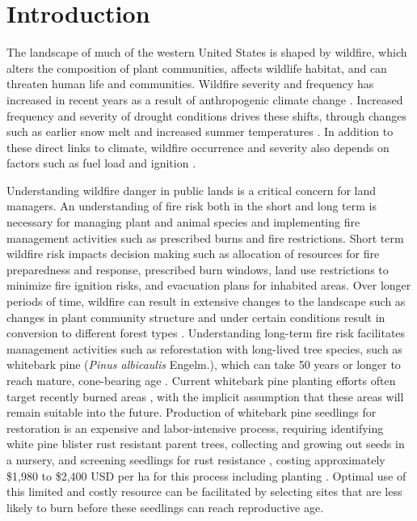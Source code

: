 \documentclass[11p]{article}
\begin{document}
\section{Introduction}

The landscape of much of the western United States is shaped by wildfire, which alters the composition of plant communities, affects wildlife habitat, and can threaten human life and communities. Wildfire severity and frequency has increased in recent years as a result of anthropogenic climate change \citep{abatzoglouImpactAnthropogenicClimate2016,runningGlobalWarmingCausing2006,boerChangingWeatherExtremes2017,littellReviewRelationshipsDrought2016}. Increased frequency and severity of drought conditions drives these shifts, through changes such as earlier snow melt \citep{tercekForecasts21stCentury2016} and increased summer temperatures \citep{runningGlobalWarmingCausing2006}. In addition to these direct links to climate, wildfire occurrence and severity also depends on factors such as fuel load and ignition \citep{mckenzieClimateChangeEcohydrology2017}.

Understanding wildfire danger in public lands is a critical concern for land managers. An understanding of fire risk both in the short and long term is necessary for managing plant and animal species and implementing fire management activities such as prescribed burns and fire restrictions. Short term wildfire risk impacts decision making such as allocation of resources for fire preparedness and response, prescribed burn windows, land use restrictions to minimize fire ignition risks, and evacuation plans for inhabited areas. Over longer periods of time, wildfire can result in extensive changes to the landscape such as changes in plant community structure and under certain conditions result in conversion to different forest types \citep{coopWildfireDrivenForestConversion2020}. Understanding long-term fire risk facilitates management activities such as reforestation with long-lived tree species, such as whitebark pine (\textit{Pinus albicaulis} Engelm.), which can take 50 years or longer to reach mature, cone-bearing age \citep{tombackWhitebarkPineCommunities2001}. Current whitebark pine planting efforts often target recently burned areas \citep{keaneRangewideRestorationStrategy2012}, with the implicit assumption that these areas will remain suitable into the future. Production of whitebark pine seedlings for restoration is an expensive and labor-intensive process, requiring identifying white pine blister rust resistant parent trees, collecting and growing out seeds in a nursery, and screening seedlings for rust resistance \citep{tombackTammReviewCurrent2022}, costing approximately \$1,980 to \$2,400 USD per ha for this process including planting \citep{tombackMagnificentHighElevationFiveNeedle2011}. Optimal use of this limited and costly resource can be facilitated by selecting sites that are less likely to burn before these seedlings can reach reproductive age.
\end{document}
